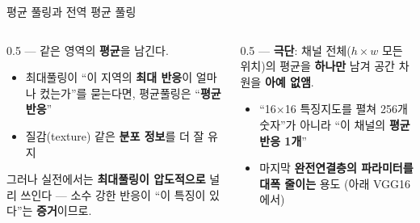 \begin{frame}{평균 풀링과 전역 평균 풀링}
  \begin{columns}[T]
    \begin{column}{0.5\textwidth}
       ---
      같은 영역의 \textbf{평균}을 남긴다.
      \begin{itemize}
        \item 최대풀링이 ``이 지역의 \textbf{최대 반응}이 얼마나
          컸는가''를 묻는다면, 평균풀링은 ``\textbf{평균 반응}''
        \item 질감(texture) 같은 \textbf{분포 정보}를 더 잘 유지
      \end{itemize}
      그러나 실전에서는 \textbf{최대풀링이 압도적으로} 널리 쓰인다 ---
      소수 강한 반응이 ``이 특징이 있다''는 \textbf{증거}이므로.
    \end{column}
    \begin{column}{0.5\textwidth}
       ---
      \textbf{극단}: 채널 전체($h\times w$ 모든 위치)의 평균을
      \textbf{하나만} 남겨 공간 차원을 \textbf{아예 없앰}.
      \begin{itemize}
        \item ``16$\times$16 특징지도를 펼쳐 256개 숫자''가 아니라
          ``이 채널의 \textbf{평균 반응 1개}''
        \item 마지막 \textbf{완전연결층의 파라미터를 대폭 줄이는}
          용도 (아래 VGG16에서)
      \end{itemize}
    \end{column}
  \end{columns}
\end{frame}
